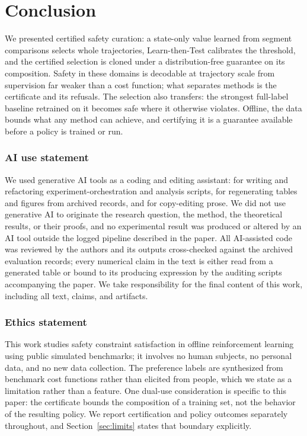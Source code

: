 \documentclass{article} %
\begin{document}
\section{Conclusion}
\label{sec:conclusion}
We presented certified safety curation: a state-only value learned from segment comparisons selects whole trajectories, Learn-then-Test calibrates the threshold, and the certified selection is cloned under a distribution-free guarantee on its composition. Safety in these domains is decodable at trajectory scale from supervision far weaker than a cost function; what separates methods is the certificate and its refusals. The selection also transfers: the strongest full-label baseline retrained on it becomes safe where it otherwise violates. Offline, the data bounds what any method can achieve, and certifying it is a guarantee available before a policy is trained or run.

\subsubsection*{AI use statement}
We used generative AI tools as a coding and editing assistant: for writing and
refactoring experiment-orchestration and analysis scripts, for regenerating
tables and figures from archived records, and for copy-editing prose. We did not
use generative AI to originate the research question, the method, the
theoretical results, or their proofs, and no experimental result was produced or
altered by an AI tool outside the logged pipeline described in the paper. All
AI-assisted code was reviewed by the authors and its outputs cross-checked
against the archived evaluation records; every numerical claim
in the text is either read from a generated table or bound to its producing expression by the
auditing scripts accompanying the paper.
We take responsibility for the final content of this work, including all text,
claims, and artifacts.

\subsubsection*{Ethics statement}
This work studies safety constraint satisfaction in offline reinforcement
learning using public simulated benchmarks; it involves no human subjects, no
personal data, and no new data collection. The preference labels are synthesized
from benchmark cost functions rather than elicited from people, which we state
as a limitation rather than a feature. One dual-use consideration is specific to this paper: the certificate bounds the
composition of a training set, not the behavior of the resulting policy. We
report certification and policy outcomes separately throughout, and
Section~\ref{sec:limits} states that boundary explicitly.
\end{document}
